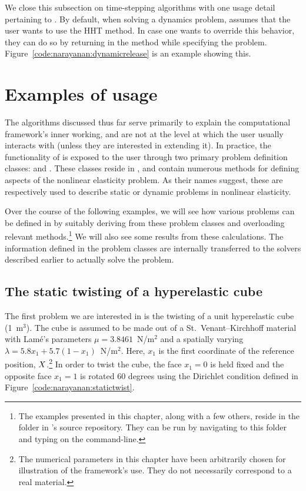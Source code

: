 We close this subsection on time-stepping algorithms with one usage
detail pertaining to \twist. By default, when solving a dynamics
problem, \twist{} assumes that the user wants to use the HHT
method. In case one wants to override this behavior, they can do so by
returning  in the  method while
specifying the problem. Figure~\ref{code:narayanan:dynamicrelease} is
an example showing this.

\section{Examples of \twist{} usage}

The algorithms discussed thus far serve primarily to explain the
computational framework's inner working, and are not at the level at
which the user usually interacts with \twist{} (unless they are
interested in extending it). In practice, the functionality of
\twist{} is exposed to the user through two primary problem definition
classes:  and . These
classes reside in , and contain numerous
methods for defining aspects of the nonlinear elasticity problem. As
their names suggest, these are respectively used to describe static or
dynamic problems in nonlinear elasticity.

Over the course of the following examples, we will see how various
problems can be defined in \twist{} by suitably deriving from these
problem classes and overloading relevant methods.\footnote{The
examples presented in this chapter, along with a few others, reside in
the  folder in \twist's source repository. They can
be run by navigating to this folder and typing  on the command-line.} We will also see some results
from these calculations. The information defined in the problem
classes are internally transferred to the solvers described earlier to
actually solve the problem.

\subsection{The static twisting of a hyperelastic cube}

The first problem we are interested in is the twisting of a unit
hyperelastic cube (1~m$^3$). The cube is assumed to be made out of a
St.~Venant--Kirchhoff material with Lam\'e's parameters $\mu =
3.8461$~N/m$^2$ and a spatially varying $\lambda = 5.8 x_{1} + 5.7 (1
- x_{1})$~N/m$^2$. Here, $x_{1}$ is the first coordinate of the
reference position, $\mbox{$ X$}$.\footnote{The numerical parameters in this
  chapter have been arbitrarily chosen for illustration of the
  framework's use. They do not necessarily correspond to a real
  material.} In order to twist the cube, the face $x_{1} = 0$ is held
fixed and the opposite face $x_{1} = 1$ is rotated 60 degrees using
the Dirichlet condition defined in
Figure~\ref{code:narayanan:statictwist}.

